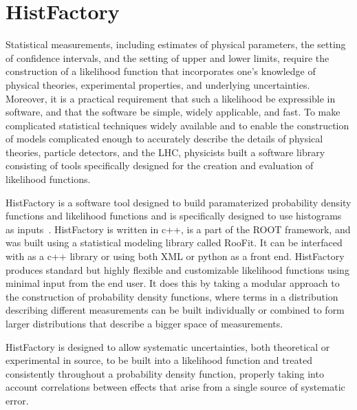 

\chapter{HistFactory}
\label{app:histfactory}

Statistical measurements, including estimates of physical parameters, the setting of confidence intervals, and the setting of upper and lower limits, require the construction of a likelihood function that incorporates one's knowledge of physical theories, experimental properties, and underlying uncertainties.
Moreover, it is a practical requirement that such a likelihood be expressible in software, and that the software be simple, widely applicable, and fast.
To make complicated statistical techniques widely available and to enable the construction of models complicated enough to accurately describe the details of physical theories, particle detectors, and the LHC, physicists built a software library consisting of tools specifically designed for the creation and evaluation of likelihood functions.

HistFactory is a software tool designed to build paramaterized probability density functions and likelihood functions and is specifically designed to use histograms as inputs~\cite{Cranmer:1456844}.
HistFactory is written in c++, is a part of the ROOT framework, and was built using a statistical modeling library called RooFit.
It can be interfaced with as a c++ library or using both XML or python as a front end.
HistFactory produces standard but highly flexible and customizable likelihood functions using minimal input from the end user.
It does this by taking a modular approach to the construction of probability density functions, where terms in a distribution describing different measurements can be built individually or combined to form larger distributions that describe a bigger space of measurements.

HistFactory is designed to allow systematic uncertainties, both theoretical or experimental in source, to be built into a likelihood function and treated consistently throughout a probability density function, properly taking into account correlations between effects that arise from a single source of systematic error.



